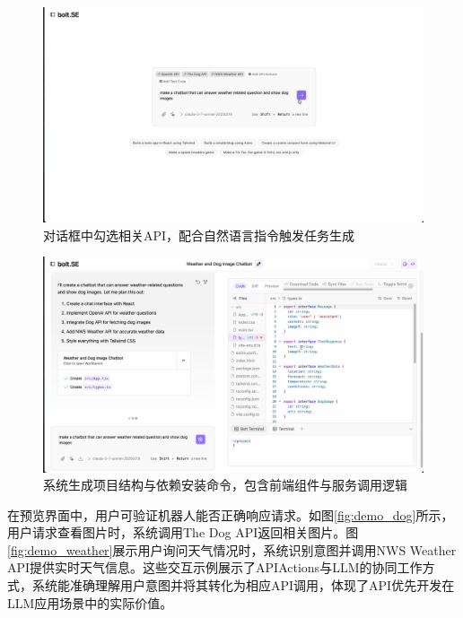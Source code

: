 \begin{figure}
  \centering
  \includegraphics[width=\textwidth]{figures/screenshots/api-actions/demo_prompt_tags.png}
  \caption{对话框中勾选相关API，配合自然语言指令触发任务生成}
  \label{fig:demo_prompt}
\end{figure}

\begin{figure}
  \centering
  \includegraphics[width=\textwidth]{figures/screenshots/api-actions/demo_plan_files.png}
  \caption{系统生成项目结构与依赖安装命令，包含前端组件与服务调用逻辑}
  \label{fig:demo_plan}
\end{figure}

在预览界面中，用户可验证机器人能否正确响应请求。如图\ref{fig:demo_dog}所示，用户请求查看图片时，系统调用The Dog API返回相关图片。图\ref{fig:demo_weather}展示用户询问天气情况时，系统识别意图并调用NWS Weather API提供实时天气信息。这些交互示例展示了APIActions与LLM的协同工作方式，系统能准确理解用户意图并将其转化为相应API调用，体现了API优先开发在LLM应用场景中的实际价值。

